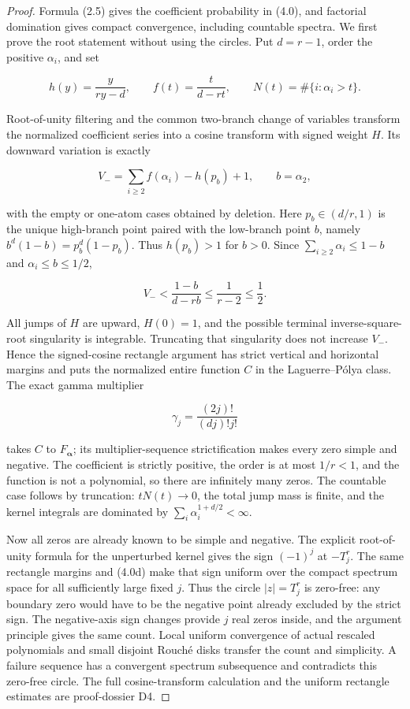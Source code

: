 \documentclass[10pt]{article}
\begin{document}
\begin{proof}


Formula (2.5) gives the coefficient probability in (4.0), and factorial
domination gives compact convergence, including countable spectra.  We first
prove the root statement without using the circles.  Put $d=r-1$, order the
positive $\alpha_i$, and set

\[
 h(y)=\frac{y}{ry-d},\qquad f(t)=\frac{t}{d-rt},
 \qquad N(t)=\#\{i:\alpha_i>t\}. \tag{4.0b}
\]

Root-of-unity filtering and the common two-branch change of variables transform
the normalized coefficient series into a cosine transform with signed weight
$H$.  Its downward variation is exactly

\[
 V_-=\sum_{i\ge2}f(\alpha_i)-h(p_b)+1,
 \qquad b=\alpha_2, \tag{4.0c}
\]

with the empty or one-atom cases obtained by deletion.  Here
$p_b\in(d/r,1)$ is the unique high-branch point paired with the
low-branch point $b$, namely
$b^d(1-b)=p_b^d(1-p_b)$.  Thus $h(p_b)>1$ for $b>0$.
Since $\sum_{i\ge2}\alpha_i\le1-b$ and $\alpha_i\le b\le1/2$,

\[
 V_-<\frac{1-b}{d-rb}\le\frac1{r-2}\le\frac12. \tag{4.0d}
\]

All jumps of $H$ are upward, $H(0)=1$, and the possible terminal
inverse-square-root singularity is integrable.  Truncating that singularity
does not increase $V_-$.  Hence the signed-cosine rectangle argument has
strict vertical and horizontal margins and puts the normalized entire function
$C$ in the Laguerre--Pólya class.  The exact gamma multiplier

\[
 \gamma_j=\frac{(2j)!}{(dj)!j!} \tag{4.0e}
\]

takes $C$ to $F_{\boldsymbol\alpha}$; its multiplier-sequence
strictification makes every zero simple and negative.  The coefficient is
strictly positive, the order is at most $1/r<1$, and the function is not a
polynomial, so there are infinitely many zeros.  The countable case follows
by truncation: $tN(t)\to0$, the total jump mass is finite, and the kernel
integrals are dominated by $\sum_i\alpha_i^{1+d/2}<\infty$.

Now all zeros are already known to be simple and negative.  The explicit
root-of-unity formula for the unperturbed kernel gives the sign $(-1)^j$ at
$-T_j^r$.  The same rectangle margins and (4.0d) make that sign uniform over
the compact spectrum space for all sufficiently large fixed $j$.  Thus the
circle $|z|=T_j^r$ is zero-free: any boundary zero would have to be the
negative point already excluded by the strict sign.  The negative-axis sign
changes provide $j$ real zeros inside, and the argument principle gives the
same count.  Local uniform convergence of actual rescaled polynomials and
small disjoint Rouché disks transfer the count and simplicity.  A failure
sequence has a convergent spectrum subsequence and contradicts this zero-free
circle.  The full cosine-transform calculation and the uniform rectangle
estimates are proof-dossier D4.
\end{proof}
\end{document}
